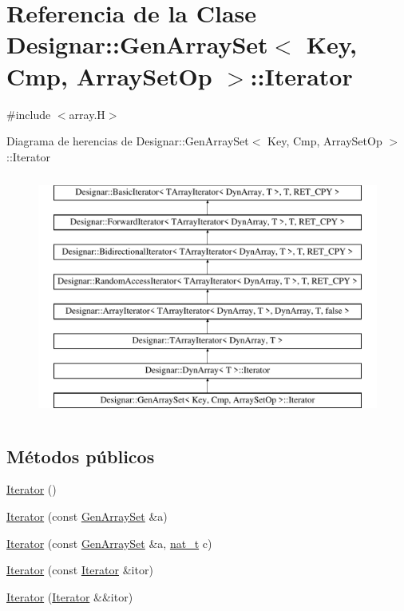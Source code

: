 \hypertarget{class_designar_1_1_gen_array_set_1_1_iterator}{}\section{Referencia de la Clase Designar\+:\+:Gen\+Array\+Set$<$ Key, Cmp, Array\+Set\+Op $>$\+:\+:Iterator}
\label{class_designar_1_1_gen_array_set_1_1_iterator}


{\ttfamily \#include $<$array.\+H$>$}

Diagrama de herencias de Designar\+:\+:Gen\+Array\+Set$<$ Key, Cmp, Array\+Set\+Op $>$\+:\+:Iterator\begin{figure}[H]
\begin{center}
\leavevmode
\includegraphics[height=8.000000cm]{class_designar_1_1_gen_array_set_1_1_iterator}
\end{center}
\end{figure}
\subsection*{Métodos públicos}
\begin{DoxyCompactItemize}
\item 
\hyperlink{class_designar_1_1_gen_array_set_1_1_iterator_a9f4aba730b697c071ffc51ef70db48ce}{Iterator} ()
\item 
\hyperlink{class_designar_1_1_gen_array_set_1_1_iterator_ae7870668057c79aefda6001548c550f1}{Iterator} (const \hyperlink{class_designar_1_1_gen_array_set}{Gen\+Array\+Set} \&a)
\item 
\hyperlink{class_designar_1_1_gen_array_set_1_1_iterator_a83846a50fb3a6dd02611aa331520d69a}{Iterator} (const \hyperlink{class_designar_1_1_gen_array_set}{Gen\+Array\+Set} \&a, \hyperlink{namespace_designar_aa72662848b9f4815e7bf31a7cf3e33d1}{nat\+\_\+t} c)
\item 
\hyperlink{class_designar_1_1_gen_array_set_1_1_iterator_a080025e4989fd5c3110e93e0c7c17fe2}{Iterator} (const \hyperlink{class_designar_1_1_gen_array_set_1_1_iterator}{Iterator} \&itor)
\item 
\hyperlink{class_designar_1_1_gen_array_set_1_1_iterator_aa82e1690f18b28782163e6bbb9d7d32a}{Iterator} (\hyperlink{class_designar_1_1_gen_array_set_1_1_iterator}{Iterator} \&\&itor)
\end{DoxyCompactItemize}
